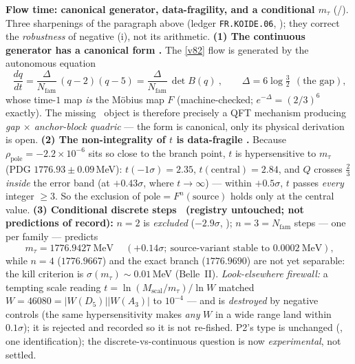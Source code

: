 \documentclass[11pt,a4paper]{article}
\newcommand{\Nfam}{N_{\mathrm{fam}}}
\begin{document}
\par\smallskip\noindent\textbf{Flow time: canonical generator, data-fragility, and a conditional $m_\tau$} (\mE/\mC).
Three sharpenings of the paragraph above (ledger \texttt{FR.KOIDE.06}, ); they correct the \emph{robustness} of
negative (i), not its arithmetic. \textbf{(1) The continuous generator has a canonical form \mE.} The \vref{v82}
flow is generated by the autonomous equation
\[
  \boxed{\ \frac{dq}{dt}=\frac{\Delta}{\Nfam}\,(q-2)(q-5)=\frac{\Delta}{\Nfam}\,\det B(q)\ },\qquad
  \Delta=6\log\tfrac32\ \ (\text{the gap}),
\]
whose time-$1$ map \emph{is} the M\"obius map $F$ (machine-checked; $e^{-\Delta}=(2/3)^6$ exactly). The
missing \mC\ object is therefore precisely a QFT mechanism producing \emph{gap $\times$ anchor-block
quadric} --- the form is canonical, only its physical derivation is open. \textbf{(2) The non-integrality
of $t$ is data-fragile \mE.} Because $\rho_{\mathrm{pole}}=-2.2\times10^{-6}$ sits so close to the branch
point, $t$ is hypersensitive to $m_\tau$ (PDG $1776.93\pm0.09$\,MeV): $t(-1\sigma)=2.35$,
$t(\mathrm{central})=2.84$, and $Q$ crosses $\tfrac23$ \emph{inside} the error band (at $+0.43\sigma$,
where $t\to\infty$) --- within $+0.5\sigma$, $t$ passes \emph{every} integer $\ge3$. So the exclusion of
$\mathrm{pole}=F^n(\mathrm{source})$ holds only at the central value. \textbf{(3) Conditional discrete
steps \mC\ (registry untouched; not predictions of record):} $n{=}2$ is \emph{excluded} ($-2.9\sigma$,
\mE); $n{=}3{=}\Nfam$ steps --- one per family --- predicts
\[
  \boxed{\ m_\tau=1776.9427\ \mathrm{MeV}\ }\quad(+0.14\sigma;\ \text{source-variant stable to }0.0002\ \mathrm{MeV}),
\]
while $n{=}4$ ($1776.9667$) and the exact branch ($1776.9690$) are not yet separable: the kill criterion
is $\sigma(m_\tau)\!\sim\!0.01$\,MeV (Belle~II). \emph{Look-elsewhere firewall:} a tempting scale reading
$t=\ln(M_{\mathrm{scal}}/m_\tau)/\ln W$ matched $W=46080=|W(D_5)||W(A_3)|$ to $10^{-4}$ --- and is
\emph{destroyed} by negative controls (the same hypersensitivity makes \emph{any} $W$ in a wide range land
within $0.1\sigma$); it is rejected and recorded so it is not re-fished. P2's type is unchanged (\mC, one
identification); the discrete-vs-continuous question is now \emph{experimental}, not settled.

\end{document}
